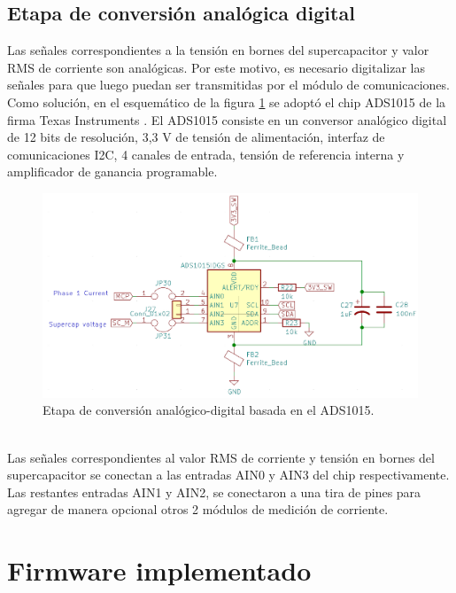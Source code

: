 \subsection{Etapa de conversión analógica digital}
Las señales correspondientes a la tensión en bornes del supercapacitor y valor RMS de corriente son analógicas. Por este motivo, es necesario digitalizar las señales para que luego puedan ser transmitidas por el módulo de comunicaciones.\\
Como solución, en el esquem\'{a}tico de la figura \ref{fig:ctoadc} se adoptó el chip ADS1015 de la firma Texas Instruments \citep{ads1015}. 
El ADS1015 consiste en un conversor analógico digital de 12 bits de resolución, 3,3 V de tensión de alimentación, interfaz de comunicaciones I2C, 4 canales de entrada, tensión de referencia interna y amplificador de ganancia programable.\\
\begin{figure}[h!]
	\centering
	\includegraphics[width=1.0\linewidth]{Figures/cto_adc}
	\caption{Etapa de conversión analógico-digital basada en el ADS1015.}
	\label{fig:ctoadc}
\end{figure}\\
Las señales correspondientes al valor RMS de corriente y tensión en bornes del supercapacitor se conectan a las entradas AIN0 y AIN3 del chip respectivamente. Las restantes entradas AIN1 y AIN2, se conectaron a una tira de pines para agregar de manera opcional otros 2 módulos de medición de corriente.\\


\section{Firmware implementado}
\label{seccion_firmware}
